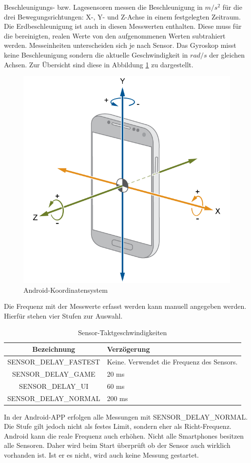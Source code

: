 \documentclass[11pt,a4paper]{report}
\begin{document}
Beschleunigungs- bzw. Lagesensoren messen die Beschleunigung in $m/s^2$ für die drei Bewegungsrichtungen: X-, Y- und Z-Achse in einem festgelegten Zeitraum.
Die Erdbeschleunigung ist auch in diesen Messwerten enthalten.
Diese muss für die bereinigten, realen Werte von den aufgenommenen Werten subtrahiert werden\cite{accel_g}.
Messeinheiten unterscheiden sich je nach Sensor.
Das Gyroskop misst keine Beschleunigung sondern die aktuelle Geschwindigkeit in $rad/s$ der gleichen Achsen.
Zur Übersicht sind diese in Abbildung \ref{fig:and_axes} zu dargestellt.
\begin{figure}[htbp]
  \centering
  \includegraphics[width=.7\textwidth]{images/android_axes.png}
  \caption{Android-Koordinatensystem}
  \label{fig:and_axes}
\end{figure}
Die Frequenz mit der Messwerte erfasst werden kann manuell angegeben werden.
Hierfür stehen vier Stufen zur Auswahl.
\begin{table}[htbp]
  \centering
  \begin{tabular}{|c|p{4cm}|}
      \hline
      \textbf{Bezeichnung} & \textbf{Verzögerung} \\
	  \hline
      SENSOR\_DELAY\_FASTEST & Keine. Verwendet die Frequenz des Sensors.\\
      \hline
      SENSOR\_DELAY\_GAME & 20 ms\\
      \hline
      SENSOR\_DELAY\_UI & 60 ms\\
      \hline
      SENSOR\_DELAY\_NORMAL & 200 ms\\
      \hline
  \end{tabular}
  \caption{Sensor-Taktgeschwindigkeiten\cite{sensor-takt}}
  \label{tab:sensor_speeds}
\end{table}
In der Android-APP erfolgen alle Messungen mit SENSOR\_DELAY\_NORMAL.
Die Stufe gilt jedoch nicht als festes Limit, sondern eher als Richt-Frequenz.
Android kann die reale Frequenz auch erhöhen.
Nicht alle Smartphones besitzen alle Sensoren.
Daher wird beim Start überprüft ob der Sensor auch wirklich vorhanden ist.
Ist er es nicht, wird auch keine Messung gestartet.
\end{document}
